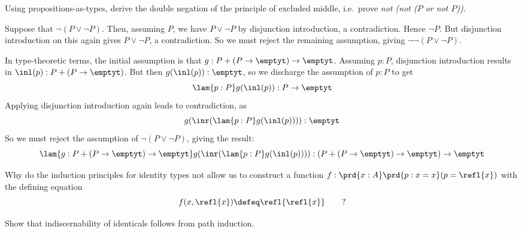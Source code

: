   Using propositions-as-types, derive the double negation of the
principle of excluded middle, i.e.~prove \emph{not (not ($P$ or not $P$))}.

\soln  Suppose that $\lnot(P \lor \lnot P)$.  Then, assuming $P$, we have
$P \lor \lnot P$ by disjunction introduction, a contradiction.  Hence
$\lnot P$.  But disjunction introduction on this again gives $P \lor \lnot P$,
a contradiction.  So we must reject the remaining assumption, giving
$\lnot\lnot(P \lor \lnot P)$.

In type-theoretic terms, the initial assumption is that $g : P + (P \to
\emptyt) \to \emptyt$.  Assuming $p : P$, disjunction introduction results in
$\inl(p) : P + (P \to \emptyt)$.  But then $g(\inl(p)) : \emptyt$, so we
discharge the assumption of $p : P$ to get
\[
  \lam{p:P}g(\inl(p)) : P \to \emptyt
\]
Applying disjunction introduction again leads to contradiction, as
\[
  g(\inr(\lam{p:P}g(\inl(p)))) : \emptyt
\]
So we must reject the assumption of $\lnot( P \lor \lnot P)$, giving the
result:
\[
  \lam{g:P + (P \to \emptyt) \to \emptyt}g(\inr(\lam{p:P}g(\inl(p)))) 
  : 
  (P + (P \to \emptyt) \to \emptyt) \to \emptyt
\]


  Why do the induction principles for identity types not allow
us to construct a function $f : \prd{x:A}\prd{p:x=x}(p = \refl{x})$ with the
defining equation
\[
  f(x, \refl{x}) \defeq \refl{\refl{x}}\qquad?
\]

 Show that indiscernability of identicals follows from path
induction.

